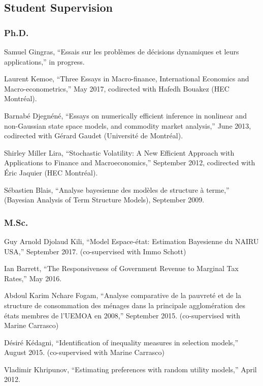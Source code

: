 \documentclass[12pt]{article}
\begin{document}
\subsection*{Student Supervision}

\subsubsection*{Ph.D.}

Samuel Gingras, ``Essais sur les probl\`emes de d\'ecisions dynamiques et leurs applications,''
in progress.

Laurent Kemoe, ``Three Essays in Macro-finance, International Economics and Macro-econometrics,''
May 2017, codirected with Hafedh Bouakez (HEC Montr\'eal).

Barnab\'e Djegn\'en\'e,
``Essays on numerically efficient inference in nonlinear and non-Gaussian state space models, and commodity market analysis,''
June 2013, codirected with G\'erard Gaudet (Universit\'e de Montr\'eal).

Shirley Miller Lira,
``Stochastic Volatility: A New Efficient Approach with Applications to Finance and Macroeconomics,''
September 2012, codirected with \'Eric Jaquier (HEC Montr\'eal).

S\'ebastien Blais,
``Analyse bayesienne des mod\`eles de structure \`a terme,''
(Bayesian Analysis of Term Structure Models),
September 2009.

\subsubsection*{M.Sc.}

Guy Arnold Djolaud Kili,
``Model Espace-\'etat: Estimation Bayesienne du NAIRU USA,''
September 2017. (co-supervised with Immo Schott)

Ian Barrett,
``The Responsiveness of Government Revenue to Marginal Tax Rates,''
May 2016.

Abdoul Karim Nchare Fogam,
``Analyse comparative de la pauvret\'e et de la structure de consommation des m\'enages dans la principale agglom\'eration des \'etats membres de l’UEMOA en 2008,''
September 2015. (co-supervised with Marine Carrasco)

D\'esir\'e K\'edagni,
``Identification of inequality measures in selection models,''
August 2015. (co-supervised with Marine Carrasco)

Vladimir Khripunov,
``Estimating preferences with random utility models,''
April 2012.
\end{document}

